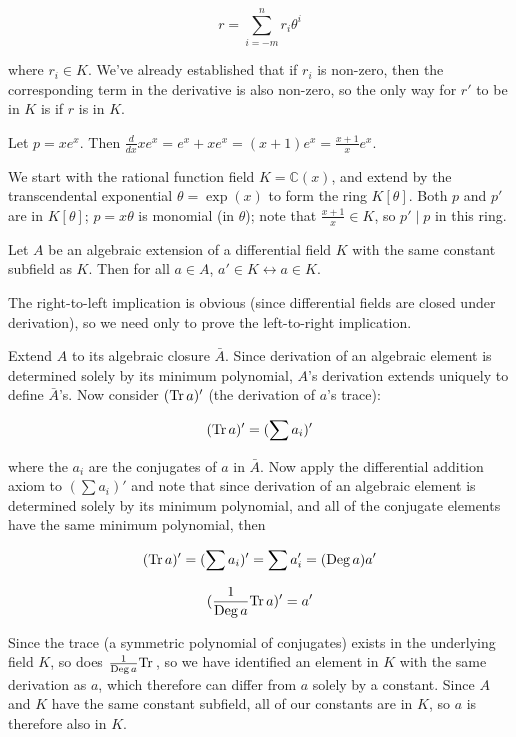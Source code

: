 $$r = \sum_{i=-m}^n r_i \theta^i$$

where $r_i \in K$.  We've already established that if $r_i$ is
non-zero, then the corresponding term in the derivative
is also non-zero, so the only way for $r'$ to be in $K$ is if
$r$ is in $K$.

\endtheorem

\example Let $p = x e^x$.  Then
$\frac{d}{dx} x e^x = e^x + x e^x = (x+1) e^x = \frac{x+1}{x} e^x$.

We start with the rational function field $K = {\mathbb C}(x)$, and
extend by the transcendental exponential $\theta = \exp(x)$ to form
the ring $K[\theta]$.  Both $p$ and $p'$ are in $K[\theta]$;
$p=x\theta$ is monomial (in $\theta$); note that $\frac{x+1}{x} \in
K$, so $p' \mid p$ in this ring.

\endexample

\theorem

Let $A$ be an algebraic extension of a differential field $K$ with the
same constant subfield as $K$.  Then for all $a\in A$, $a' \in K
\leftrightarrow a \in K$.

\proof

The right-to-left implication is obvious (since differential fields
are closed under derivation), so we need only to prove the
left-to-right implication.

Extend $A$ to its algebraic closure $\bar{A}$.  Since derivation of an
algebraic element is determined solely by its minimum polynomial,
$A$'s derivation extends uniquely to define $\bar{A}$'s.  Now
consider $({\rm Tr\,} a)'$ (the derivation of $a$'s trace):

$$({\rm Tr\,} a)' = (\sum a_i)'$$

where the $a_i$ are the conjugates of $a$ in $\bar{A}$.  Now apply the
differential addition axiom to $(\sum a_i)'$ and note that since
derivation of an algebraic element is determined solely by its minimum
polynomial, and all of the conjugate elements have the same minimum
polynomial, then

$$({\rm Tr\,} a)' = (\sum a_i)' = \sum a_i' = ({\rm Deg\,}a) a'$$

$$(\frac{1}{{\rm Deg\,} a}{\rm Tr\,} a)' = a'$$

Since the trace (a symmetric polynomial of conjugates) exists in the
underlying field $K$, so does $\frac{1}{{\rm Deg\,} a}{\rm Tr\,}$, so
we have identified an element in $K$ with the same derivation as $a$,
which therefore can differ from $a$ solely by a constant.  Since $A$
and $K$ have the same constant subfield, all of our constants are in
$K$, so $a$ is therefore also in $K$.

